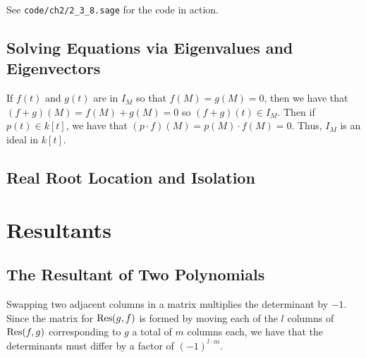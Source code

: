 \documentclass[letterpaper, 11pt, oneside]{book}
\begin{document}
\begin{sol}\label{ex:UAG_2.3.8}
  See \texttt{code/ch2/2\_3\_8.sage} for the code in action.
\end{sol}

\clearpage

\section{Solving Equations via Eigenvalues and Eigenvectors}

\begin{sol}\label{ex:UAG_2.4.2}
  If $f(t)$ and $g(t)$ are in $I_{M}$ so that $f(M) = g(M) = 0$, then we have that $(f + g)(M) = f(M) + g(M) = 0$ so $(f + g)(t) \in I_{M}$.
  Then if $p(t) \in k[t]$, we have that $(p \cdot f)(M) = p(M) \cdot f(M) = 0$.
  Thus, $I_{M}$ is an ideal in $k[t]$.
\end{sol}

\clearpage

\section{Real Root Location and Isolation}

\chapter{Resultants}

\section{The Resultant of Two Polynomials}

\begin{sol}\label{ex:UAG_3.1.1}
  Swapping two adjacent columns in a matrix multiplies the determinant by $-1$.
  Since the matrix for $\Res(g, f)$ is formed by moving each of the $l$ columns of $\Res(f, g)$ corresponding to $g$ a total of $m$ columns each, we have that the determinants must differ by a factor of $(-1)^{l \cdot m}$.
\end{sol}
\end{document}
